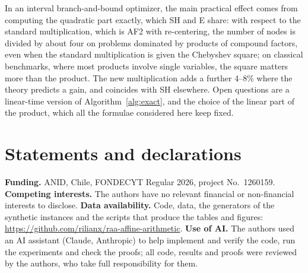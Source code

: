 \documentclass[10pt]{article}
\theoremstyle{definition}
\begin{document}
In an interval branch-and-bound optimizer, the main practical effect comes from computing the quadratic part exactly, which SH and E share: with respect to the standard multiplication, which is AF2 with re-centering, the number of nodes is divided by about four on problems dominated by products of compound factors, even when the standard multiplication is given the Chebyshev square; on classical benchmarks, where most products involve single variables, the square matters more than the product. The new multiplication adds a further 4--8\% where the theory predicts a gain, and coincides with SH elsewhere. Open questions are a linear-time version of Algorithm~\ref{alg:exact}, and the choice of the linear part of the product, which all the formulae considered here keep fixed.

\section*{Statements and declarations}
\textbf{Funding.} ANID, Chile, FONDECYT Regular 2026, project No.~1260159.
\textbf{Competing interests.} The authors have no relevant financial or non-financial interests to disclose.
\textbf{Data availability.} Code, data, the generators of the synthetic instances and the scripts that produce the tables and figures: \url{https://github.com/rilianx/raa-affine-arithmetic}.
\textbf{Use of AI.} The authors used an AI assistant (Claude, Anthropic) to help implement and verify the code, run the experiments and check the proofs; all code, results and proofs were reviewed by the authors, who take full responsibility for them.



\end{document}
